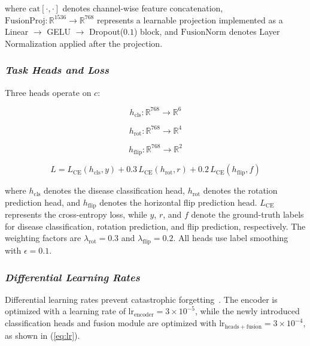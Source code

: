 \documentclass[conference]{IEEEtran}
\begin{document}
where $\mathrm{cat}[\cdot,\cdot]$ denotes channel-wise feature concatenation, $\mathrm{FusionProj}:\mathbb{R}^{1536}\rightarrow\mathbb{R}^{768}$ represents a learnable projection implemented as a Linear $\rightarrow$ GELU $\rightarrow$ Dropout($0.1$) block, and $\mathrm{FusionNorm}$ denotes Layer Normalization applied after the projection.


\subsubsection{\textit{\textbf{Task Heads and Loss}}}

Three heads operate on $c$:

\begin{equation}
h_{\mathrm{cls}}:\mathbb{R}^{768}\rightarrow\mathbb{R}^{6}
\end{equation}

\begin{equation}
h_{\mathrm{rot}}:\mathbb{R}^{768}\rightarrow\mathbb{R}^{4}
\end{equation}

\begin{equation}
h_{\mathrm{flip}}:\mathbb{R}^{768}\rightarrow\mathbb{R}^{2}
\end{equation}

\begin{equation}
L
=
L_{\mathrm{CE}}(h_{\mathrm{cls}},y)
+
0.3\,L_{\mathrm{CE}}(h_{\mathrm{rot}},r)
+
0.2\,L_{\mathrm{CE}}(h_{\mathrm{flip}},f)
\end{equation}

where $h_{\mathrm{cls}}$ denotes the disease classification head, $h_{\mathrm{rot}}$ denotes the rotation prediction head, and $h_{\mathrm{flip}}$ denotes the horizontal flip prediction head. $L_{\mathrm{CE}}$ represents the cross-entropy loss, while $y$, $r$, and $f$ denote the ground-truth labels for disease classification, rotation prediction, and flip prediction, respectively. The weighting factors are $\lambda_{\mathrm{rot}}=0.3$ and $\lambda_{\mathrm{flip}}=0.2$. All heads use label smoothing with $\epsilon=0.1$.

\vspace{0.5em}

\subsubsection{\textit{\textbf{Differential Learning Rates}}}

Differential learning rates prevent catastrophic forgetting~\cite{12}. The encoder is optimized with a learning rate of $\mathrm{lr}_{\mathrm{encoder}}=3\times10^{-5}$, while the newly introduced classification heads and fusion module are optimized with $\mathrm{lr}_{\mathrm{heads+fusion}}=3\times10^{-4}$, as shown in (\ref{eq:lr}).
\end{document}
